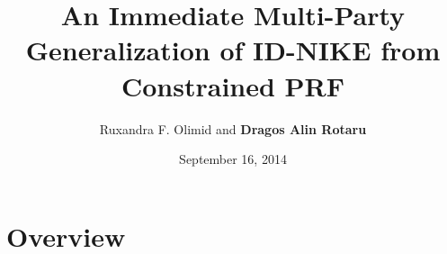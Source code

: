 \documentclass{beamer}
\title[University of Bucharest]{An Immediate Multi-Party Generalization of ID-NIKE from Constrained PRF}
\author[R.F.Olimid, D.A.Rotaru]{Ruxandra F. Olimid and \textbf{Dragos Alin Rotaru}} %
\institute[UniBuc] %
{
University of Bucharest\\ %
}
\date{September 16, 2014} %
\begin{document}
\begin{frame}
\titlepage %
\end{frame}



\section{Overview} %
\end{document}
